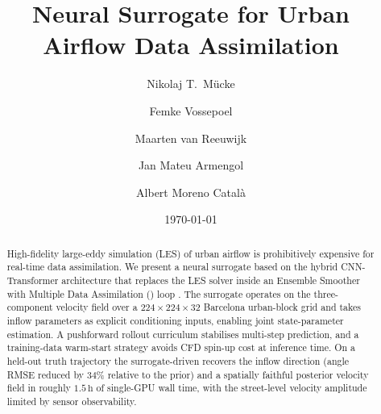 \documentclass[11pt,a4paper]{article}
\title{\textbf{\pthreed{} Neural Surrogate for Urban Airflow Data Assimilation}}
\author{Nikolaj T.~M\"ucke \and Femke Vossepoel \and Maarten van Reeuwijk
        \and Jan Mateu Armengol \and Albert Moreno Catal\`a}
\date{\today}
\begin{document}
\maketitle

\begin{abstract}
High-fidelity large-eddy simulation (LES) of urban airflow is prohibitively
expensive for real-time data assimilation. We present a neural surrogate based
on the \pthreed{} hybrid CNN-Transformer architecture \cite{holzschuh2025p3d} that
replaces the \palm{} LES solver \cite{maronga2020} inside an Ensemble Smoother
with Multiple Data Assimilation (\esmda{}) loop \cite{emerick2013}. The surrogate
operates on the three-component velocity field over a $224\times224\times32$
Barcelona urban-block grid and takes inflow parameters as explicit conditioning
inputs, enabling joint state-parameter estimation. A pushforward rollout
curriculum stabilises multi-step prediction, and a training-data warm-start
strategy avoids CFD spin-up cost at inference time. On a held-out \palm{} truth
trajectory the surrogate-driven \esmda{} recovers the inflow direction (angle RMSE
reduced by $34\%$ relative to the prior) and a spatially faithful posterior
velocity field in roughly $1.5\,\mathrm{h}$ of single-GPU wall time, with the
street-level velocity amplitude limited by sensor observability.
\end{abstract}










\end{document}
